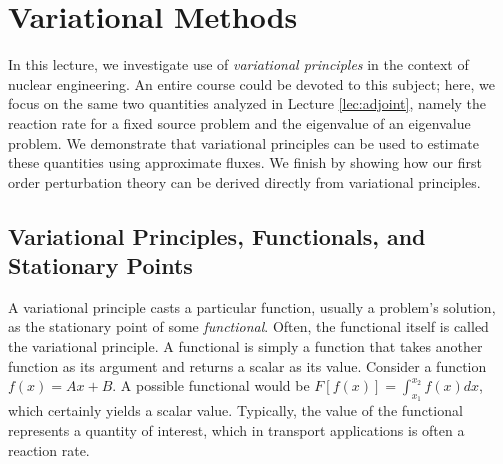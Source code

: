 \chapter{Variational Methods}

In this lecture, we investigate use of \textit{variational principles} in the 
context of nuclear engineering.  An entire course could be devoted to this 
subject; here, we focus on the same two quantities analyzed in 
Lecture \ref{lec:adjoint}, namely the reaction rate for a fixed source problem 
and the eigenvalue of an eigenvalue problem.  We demonstrate that variational 
principles can be used to estimate these quantities using approximate fluxes. 
We finish by showing how our first order perturbation theory can be derived 
directly from variational principles.

\section*{Variational Principles, Functionals, and Stationary Points}

A variational principle casts a particular function, usually a problem's 
solution, as the stationary point of some \textit{functional}. Often, the 
functional itself is called the variational principle.  A functional is 
simply a function that takes another function as its argument and returns 
a scalar as its value.  Consider a function $f(x) = Ax + B$.  A possible 
functional would be $F[f(x)] = \int_{x_1}^{x_2} f(x)dx$, which certainly 
yields a scalar value.  Typically, the value of the functional represents 
a quantity of interest, which in transport applications is often a 
reaction rate.

